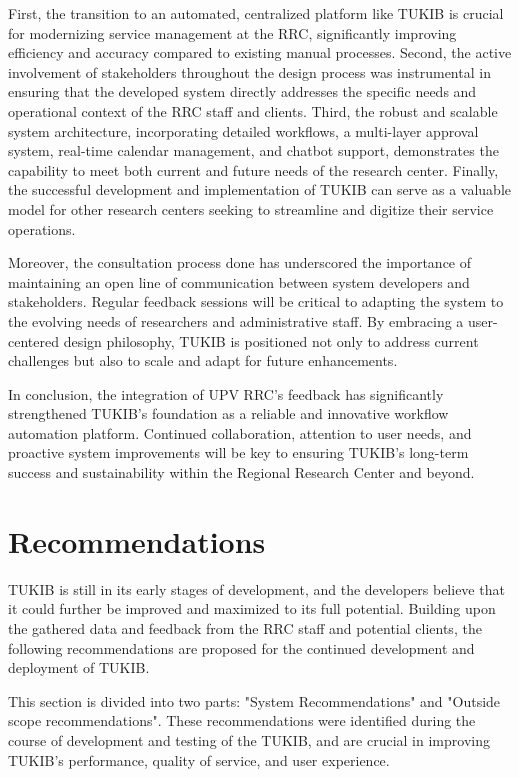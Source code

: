 First, the transition to an automated, centralized platform like TUKIB is crucial for modernizing service management at the RRC, significantly improving efficiency and accuracy compared to existing manual processes. Second, the active involvement of stakeholders throughout the design process was instrumental in ensuring that the developed system directly addresses the specific needs and operational context of the RRC staff and clients. Third, the robust and scalable system architecture, incorporating detailed workflows, a multi-layer approval system, real-time calendar management, and chatbot support, demonstrates the capability to meet both current and future needs of the research center. Finally, the successful development and implementation of TUKIB can serve as a valuable model for other research centers seeking to streamline and digitize their service operations.

Moreover, the consultation process done has underscored the importance of maintaining an open line of communication between system developers and stakeholders. Regular feedback sessions will be critical to adapting the system to the evolving needs of researchers and administrative staff. By embracing a user-centered design philosophy, TUKIB is positioned not only to address current challenges but also to scale and adapt for future enhancements.

In conclusion, the integration of UPV RRC’s feedback has significantly strengthened TUKIB’s foundation as a reliable and innovative workflow automation platform. Continued collaboration, attention to user needs, and proactive system improvements will be key to ensuring TUKIB’s long-term success and sustainability within the Regional Research Center and beyond.

\section{Recommendations}

TUKIB is still in its early stages of development, and the developers believe
that it could further be improved and maximized to its full potential. Building upon the gathered data and feedback from the RRC staff and potential clients, the following recommendations are proposed for the continued development and deployment of TUKIB. 

This section is divided into two parts: "System Recommendations" and "Outside scope recommendations". These recommendations were identified during the course of development and testing of the TUKIB, and are crucial in improving TUKIB's performance, quality of service, and user experience.

